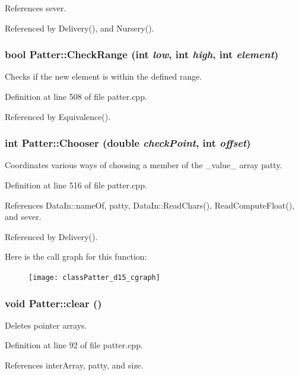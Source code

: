 References sever.

Referenced by Delivery(), and Nursery().
\subsubsection{\setlength{\rightskip}{0pt plus 5cm}bool Patter::Check\-Range (int {\em low}, int {\em high}, int {\em element})\hspace{0.3cm}{\tt  [private]}}\label{classPatter_d14}


Checks if the new element is within the defined range. 

Definition at line 508 of file patter.cpp.

Referenced by Equivalence().
\subsubsection{\setlength{\rightskip}{0pt plus 5cm}int Patter::Chooser (double {\em check\-Point}, int {\em offset})\hspace{0.3cm}{\tt  [private]}}\label{classPatter_d15}


Coordinates various ways of choosing a member of the \_\-value\_\- array patty. 

Definition at line 516 of file patter.cpp.

References Data\-In::name\-Of, patty, Data\-In::Read\-Chars(), Read\-Compute\-Float(), and sever.

Referenced by Delivery().

Here is the call graph for this function:\begin{figure}[H]
\begin{center}
\leavevmode
\texttt{[image: classPatter\_d15\_cgraph]}
\end{center}
\end{figure}
\subsubsection{\setlength{\rightskip}{0pt plus 5cm}void Patter::clear ()}\label{classPatter_a4}


Deletes pointer arrays. 

Definition at line 92 of file patter.cpp.

References inter\-Array, patty, and size.


